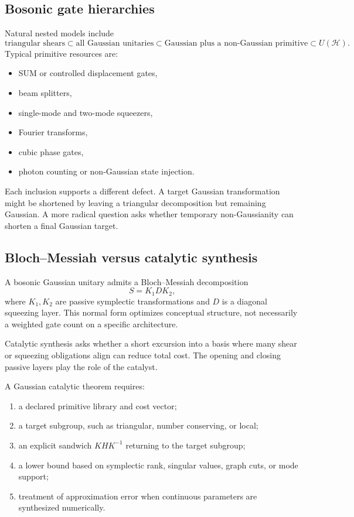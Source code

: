 \subsection{Bosonic gate hierarchies}
Natural nested models include
\[
\text{triangular shears}
\subset
\text{all Gaussian unitaries}
\subset
\text{Gaussian plus a non-Gaussian primitive}
\subset
U(\mathcal H).
\]
Typical primitive resources are:
\begin{itemize}
\item SUM or controlled displacement gates,
\item beam splitters,
\item single-mode and two-mode squeezers,
\item Fourier transforms,
\item cubic phase gates,
\item photon counting or non-Gaussian state injection.
\end{itemize}
Each inclusion supports a different defect.  A target Gaussian transformation might be shortened by leaving a triangular decomposition but remaining Gaussian.  A more radical question asks whether temporary non-Gaussianity can shorten a final Gaussian target.

\subsection{Bloch--Messiah versus catalytic synthesis}
A bosonic Gaussian unitary admits a Bloch--Messiah decomposition
\[
S=K_1 D K_2,
\]
where $K_1,K_2$ are passive symplectic transformations and $D$ is a diagonal squeezing layer.  This normal form optimizes conceptual structure, not necessarily a weighted gate count on a specific architecture.

Catalytic synthesis asks whether a short excursion into a basis where many shear or squeezing obligations align can reduce total cost.  The opening and closing passive layers play the role of the catalyst.

\begin{skeletonbox}
A Gaussian catalytic theorem requires:
\begin{enumerate}
\item a declared primitive library and cost vector;
\item a target subgroup, such as triangular, number conserving, or local;
\item an explicit sandwich $KHK^{-1}$ returning to the target subgroup;
\item a lower bound based on symplectic rank, singular values, graph cuts, or mode support;
\item treatment of approximation error when continuous parameters are synthesized numerically.
\end{enumerate}
\end{skeletonbox}

